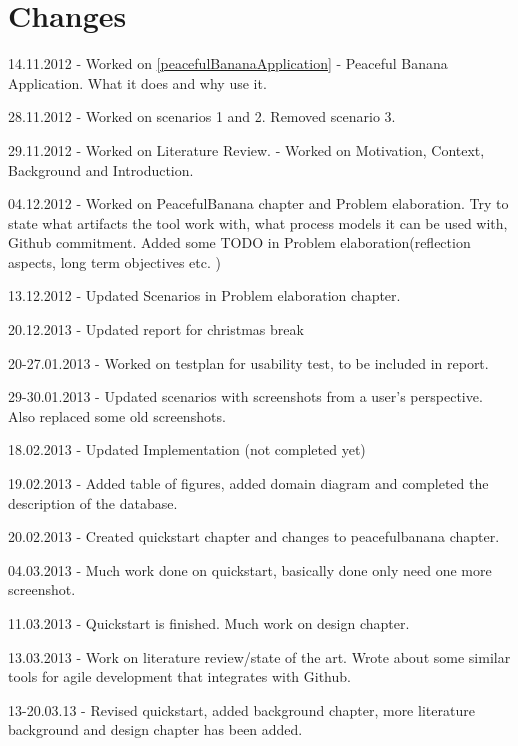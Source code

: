 \chapter*{Changes}
\begin{description}
\item 14.11.2012 - Worked on \autoref{peacefulBananaApplication} - Peaceful Banana Application. What it does and why use it.
\item 28.11.2012 - Worked on scenarios 1 and 2. Removed scenario 3. 
\item 29.11.2012 - Worked on Literature Review. - Worked on Motivation, Context, Background and Introduction. 
\item 04.12.2012 - Worked on PeacefulBanana chapter and Problem elaboration. Try to state what artifacts the tool work with, what process models it can be used with, Github commitment. Added some TODO in Problem elaboration(reflection aspects, long term objectives etc. )
\item 13.12.2012 - Updated Scenarios in Problem elaboration chapter. 
\item 20.12.2013 - Updated report for christmas break
\item 20-27.01.2013 - Worked on testplan for usability test, to be included in report. 
\item 29-30.01.2013 - Updated scenarios with screenshots from a user's perspective. Also replaced some old screenshots. 
\item 18.02.2013 - Updated Implementation (not completed yet)
\item 19.02.2013 - Added table of figures, added domain diagram and completed the description of the database.
\item 20.02.2013 - Created quickstart chapter and changes to peacefulbanana chapter.
\item 04.03.2013 - Much work done on quickstart, basically done only need one more screenshot. 
\item 11.03.2013 - Quickstart is finished. Much work on design chapter. 
\item 13.03.2013 - Work on literature review/state of the art. Wrote about some similar tools for agile development that integrates with Github.
\item 13-20.03.13 - Revised quickstart, added background chapter, more literature background and design chapter has been added. 
\end{description}